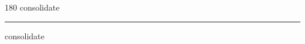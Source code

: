 
\begin{frame}
\begin{center}
\begin{turn}{180}
{\fontsize{2.5cm}{1em}\selectfont consolidate}
\end{turn}
\vspace{1em}\par  
\hrule
\vspace{1em}\par  
{\fontsize{2.5cm}{1em}\selectfont consolidate}
\end{center}
\end{frame}

